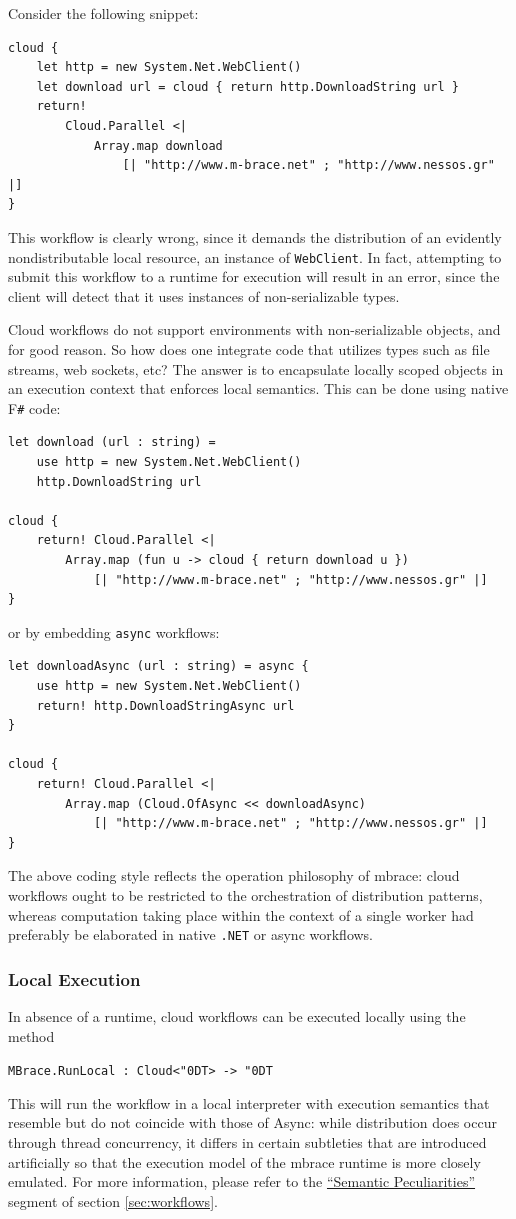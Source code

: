 \documentclass[9pt,a4paper]{article}
\newcommand{\mbrace}{mbrace}
\newcommand{\fsharp}{F\texttt \#}
\newcommand{\dotnet}{\texttt{\hbox{.}NET}}
\newcommand{\centertt}[1]{\begin{center}\texttt{#1}\end{center}}
\newcommand{\uq}{\char"0D}
\begin{document}
\noindent Consider the following snippet:
\begin{lstlisting}
cloud {
	let http = new System.Net.WebClient()
	let download url = cloud { return http.DownloadString url }
	return! 
		Cloud.Parallel <| 
			Array.map download 
				[| "http://www.m-brace.net" ; "http://www.nessos.gr" |]
}
\end{lstlisting}
This workflow is clearly wrong, since it demands the distribution of an evidently
nondistributable local resource, an instance of \texttt{WebClient}.
In fact, attempting to submit this workflow to a runtime for execution will result in
an error, since the client will detect that it uses instances of non-serializable 
types.

Cloud workflows do not support environments with non-serializable objects,
and for good reason. So how does one integrate code that utilizes types such
as file streams, web sockets, etc?
%
The answer is to encapsulate locally scoped objects in an execution context
that enforces local semantics. This can be done using native \fsharp{} code:
\begin{lstlisting}
let download (url : string) =
	use http = new System.Net.WebClient()
	http.DownloadString url

cloud {
	return! Cloud.Parallel <|
		Array.map (fun u -> cloud { return download u })
			[| "http://www.m-brace.net" ; "http://www.nessos.gr" |]
}
\end{lstlisting}
or by embedding \texttt{async} workflows:
\begin{lstlisting}
let downloadAsync (url : string) = async {
	use http = new System.Net.WebClient()
	return! http.DownloadStringAsync url
}

cloud {
	return! Cloud.Parallel <|
		Array.map (Cloud.OfAsync << downloadAsync)
			[| "http://www.m-brace.net" ; "http://www.nessos.gr" |]
} 
\end{lstlisting}

The above coding style reflects the operation philosophy of \mbrace:
cloud workflows ought to be restricted to the orchestration of distribution patterns, 
whereas computation taking place within the context of a single worker 
had preferably be elaborated in native \dotnet{} or async workflows.

\subsubsection*{Local Execution}

In absence of a runtime, cloud workflows can be executed locally using the method
%
\centertt{MBrace.RunLocal : Cloud<\uq{}T> -> \uq{}T}
%
This will run the workflow in a local interpreter with execution semantics that resemble
but do not coincide with those of Async: while distribution does occur through thread 
concurrency, it differs in certain subtleties that are introduced artificially so that 
the execution model of the \mbrace{} runtime is more closely emulated.
For more information, please refer to the \href{peculiarities}{``Semantic Peculiarities''}
segment of section \ref{sec:workflows}.
\end{document}

